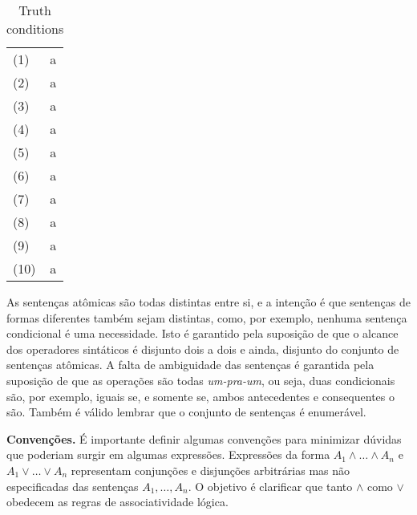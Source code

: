 \begin{center}
    \begin{table}[h!]
\label{table:sentences}
    \caption{Truth conditions}

    \begin{tabular}{ll}
        \vspace{2mm}
        (1) & a \\
        \vspace{2mm}
        (2)  & a \\
        \vspace{2mm}
        (3)  & a \\
        \vspace{2mm}
        (4)  &a \\
        \vspace{2mm}
        (5)  & a \\
        \vspace{2mm}
        (6)  &a \\
        \vspace{2mm}
        (7)  &a \\
        \vspace{2mm}
        (8)  &a \\
        \vspace{2mm}
        (9)  &a \\
        \vspace{2mm}
        (10) &a
    \end{tabular}
\end{table}
\end{center}

As sentenças at\^omicas são todas distintas entre si, e a intenção é que sentenças
de formas diferentes também sejam distintas, como, por exemplo, nenhuma sentença
condicional é uma necessidade. Isto é garantido pela suposição de que o alcance
dos operadores sintáticos é disjunto dois a dois e ainda, disjunto do conjunto
de sentenças at\^omicas.
A falta de ambiguidade das sentenças é garantida pela suposição de que as
operações são todas \textit{um-pra-um}, ou seja, duas condicionais são, por
exemplo, iguais se, e somente se, ambos antecedentes e consequentes o são.
Também é válido lembrar que o conjunto de sentenças é enumerável.

\textbf{Convenções.} É importante definir algumas convenções para minimizar 
dúvidas que poderiam surgir em algumas expressões.
Expressões da forma $A_1 \wedge \ldots \wedge A_n$ e $A_1 \vee \ldots \vee A_n$
representam conjunções e disjunções arbitrárias mas não especificadas das
sentenças $A_1,\ldots,A_n$. O objetivo é clarificar que tanto $\wedge$ como
$\vee$ obedecem as regras de associatividade lógica. 

